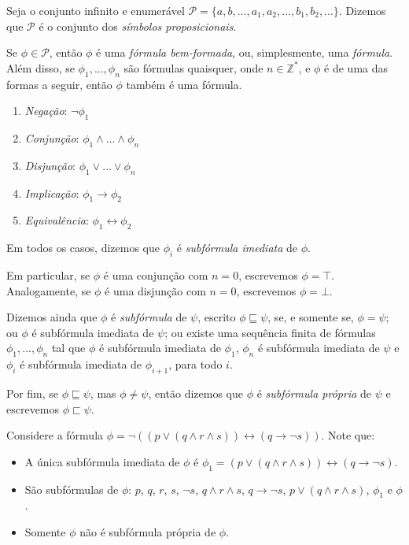\begin{definition}
    Seja o conjunto infinito e enumerável $\mathcal{P} = \{a,b,...,a_1,a_2,...,b_1,b_2,...\}$. Dizemos que $\mathcal{P}$ é o conjunto dos \emph{símbolos proposicionais}.
\end{definition}

\begin{definition}
    Se $\phi \in \mathcal{P}$, então $\phi$ é uma \emph{fórmula bem-formada}, ou, simplesmente, uma \emph{fórmula}. Além disso, se $\phi_1,...,\phi_n$ são fórmulas quaisquer, onde $n \in \mathbb{Z}^*$, e $\phi$ é de uma das formas a seguir, então $\phi$ também é uma fórmula.
    \begin{enumerate}
        \item \emph{Negação}: $\neg \phi_1$
        \item \emph{Conjunção}: $\phi_1 \wedge ... \wedge \phi_n$
        \item \emph{Disjunção}: $\phi_1 \vee ... \vee \phi_n$
        \item \emph{Implicação}: $\phi_1 \rightarrow \phi_2$
        \item \emph{Equivalência}: $\phi_1 \leftrightarrow \phi_2$
    \end{enumerate}
    Em todos os casos, dizemos que $\phi_i$ é \emph{subfórmula imediata} de $\phi$.
    
    Em particular, se $\phi$ é uma conjunção com $n=0$, escrevemos $\phi=\top$. Analogamente, se $\phi$ é uma disjunção com $n=0$, escrevemos $\phi=\bot$.
    
    Dizemos ainda que $\phi$ é \emph{subfórmula} de $\psi$, escrito $\phi \sqsubseteq \psi$, se, e somente se, $\phi = \psi$; ou $\phi$ é subfórmula imediata de $\psi$; ou existe uma sequência finita de fórmulas $\phi_1,...,\phi_n$ tal que $\phi$ é subfórmula imediata de $\phi_1$, $\phi_n$ é subfórmula imediata de $\psi$ e $\phi_i$ é subfórmula imediata de $\phi_{i+1}$, para todo $i$.
    
    Por fim, se $\phi \sqsubseteq \psi$, mas $\phi \neq \psi$, então dizemos que $\phi$ é \emph{subfórmula própria} de $\psi$ e escrevemos $\phi \sqsubset \psi$.
\end{definition}

\begin{example}
    Considere a fórmula $\phi = \neg((p \vee (q \wedge r \wedge s)) \leftrightarrow (q \rightarrow \neg s))$. Note que:
    \begin{itemize}
        \item A única subfórmula imediata de $\phi$ é $\phi_1 = (p \vee (q \wedge r \wedge s)) \leftrightarrow (q \rightarrow \neg s)$.
        \item São subfórmulas de $\phi$: $p$, $q$, $r$, $s$, $\neg s$, $q \wedge r \wedge s$, $q \rightarrow \neg s$, $p \vee (q \wedge r \wedge s)$, $\phi_1$ e $\phi$.
        \item Somente $\phi$ não é subfórmula própria de $\phi$.
    \end{itemize}
\end{example}

